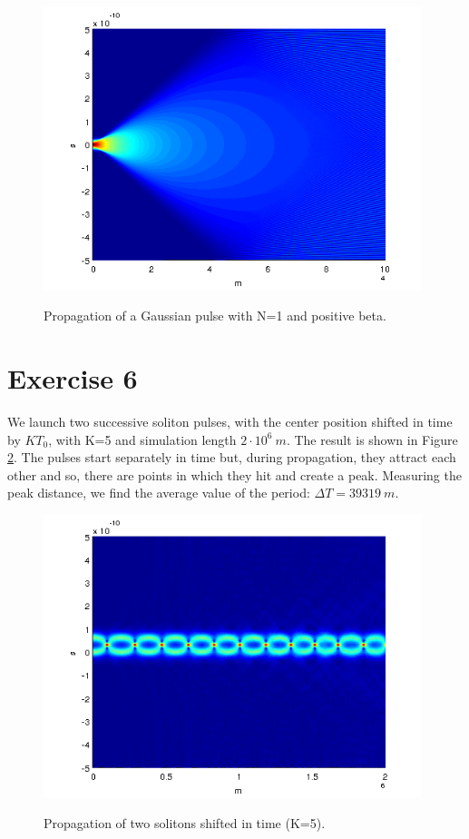\documentclass[a4paper,10pt]{report}
\begin{document}
\begin{figure}[!ht]
  \centering
  \includegraphics[width=11cm]{es5_gauss.png}\\
  \caption{Propagation of a Gaussian pulse with N=1 and positive beta.}
  \label{es5_gauss}
\end{figure}

\newpage
\section*{Exercise 6}
We launch two successive soliton pulses, with the center position shifted in time by $K T_0$, with K=5 and simulation length $2\cdot 10^6 \ m$.
The result is shown in Figure \ref{es6_1}.
The pulses start separately in time but, during propagation, they attract each other and so, there are points in which they hit and create a peak.
Measuring the peak distance, we find the average value of the period: $\Delta T=39319 \ m$.

\begin{figure}[!ht]
  \centering
  \includegraphics[width=11cm]{es6_1.png}\\
  \caption{Propagation of two solitons shifted in time (K=5).}
  \label{es6_1}
\end{figure}
\end{document}
